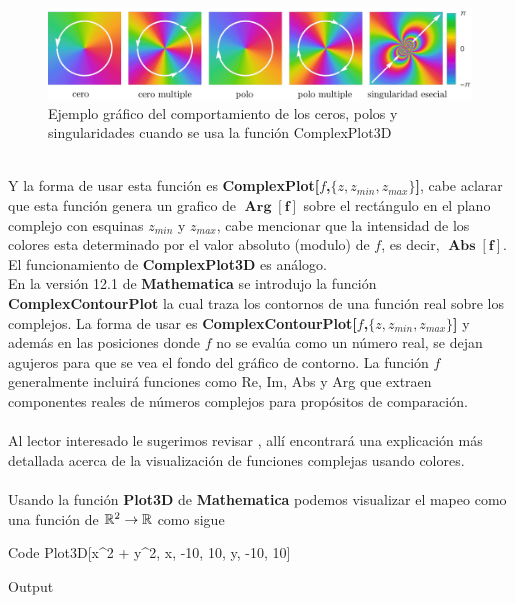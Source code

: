 \begin{figure}[h!]
	\centering
	\includegraphics[width=0.75\linewidth]{img/plotco}
	\caption{Ejemplo gráfico del comportamiento de los ceros, polos y singularidades cuando se usa la función ComplexPlot3D}
	\label{fig:plotco}
\end{figure}
\\Y la forma de usar esta función es \textbf{ComplexPlot[$f$,$\{z,z_{min},z_{max}\}$]}, cabe aclarar que esta función genera un grafico de $\mathbf{\operatorname{Arg}[f]}$ sobre el rectángulo en el plano complejo con esquinas $z_{min}$ y $z_{max}$, cabe mencionar que la intensidad de los colores esta determinado por el valor absoluto (modulo) de $f$, es decir,  $\mathbf{\operatorname{Abs}[f]}$. El funcionamiento de \textbf{ComplexPlot3D}  es análogo.\\
En la versión 12.1 de \textbf{Mathematica} se introdujo la función \textbf{ComplexContourPlot} la cual traza los contornos de una función real sobre los complejos. La forma de usar es \textbf{ComplexContourPlot[$f$,$\{z,z_{min},z_{max}\}$]} y además en las posiciones donde $f$ no se evalúa como un número real, se dejan agujeros para que se vea el fondo del gráfico de contorno. La función $f$ generalmente incluirá funciones como Re, Im, Abs y Arg que extraen componentes reales de números complejos para propósitos de comparación.\\\\
\noindent Al lector interesado le sugerimos revisar \cite{Domain_coloring}, allí encontrará una explicación más detallada acerca de la visualización de funciones complejas usando colores.\\\\
\noindent Usando la función \textbf{Plot3D} de \textbf{Mathematica} podemos visualizar el mapeo como una función de $\mathbb{R}^2 \rightarrow \mathbb{R}$ como sigue
\begin{mmaCell}[functionlocal=y]{Code}
	  Plot3D[x^2 + y^2, {x, -10, 10}, {y, -10, 10}]
\end{mmaCell}

\begin{mmaCell}[moregraphics={moreig={scale=.4}}]{Output}
\end{mmaCell}

